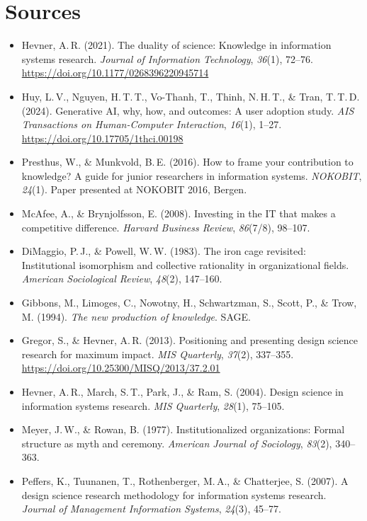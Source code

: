 \documentclass[11pt,a4paper,british,twoside=false,headings=small,chapterprefix=false,numbers=noenddot]{scrbook}
\begin{document}
\section*{Sources}
\begin{itemize}\small
  \item Hevner, A.\,R. (2021). The duality of science: Knowledge in information systems research. \emph{Journal of Information Technology}, \emph{36}(1), 72--76. \url{https://doi.org/10.1177/0268396220945714}
  \item Huy, L.\,V., Nguyen, H.\,T.\,T., Vo-Thanh, T., Thinh, N.\,H.\,T., \& Tran, T.\,T.\,D. (2024). Generative AI, why, how, and outcomes: A user adoption study. \emph{AIS Transactions on Human-Computer Interaction}, \emph{16}(1), 1--27. \url{https://doi.org/10.17705/1thci.00198}
  \item Presthus, W., \& Munkvold, B.\,E. (2016). How to frame your contribution to knowledge? A guide for junior researchers in information systems. \emph{NOKOBIT}, \emph{24}(1). Paper presented at NOKOBIT 2016, Bergen.
  \item McAfee, A., \& Brynjolfsson, E. (2008). Investing in the IT that makes a competitive difference. \emph{Harvard Business Review}, \emph{86}(7/8), 98--107.
  \item DiMaggio, P.\,J., \& Powell, W.\,W. (1983). The iron cage revisited: Institutional isomorphism and collective rationality in organizational fields. \emph{American Sociological Review}, \emph{48}(2), 147--160.
  \item Gibbons, M., Limoges, C., Nowotny, H., Schwartzman, S., Scott, P., \& Trow, M. (1994). \emph{The new production of knowledge}. SAGE.
  \item Gregor, S., \& Hevner, A.\,R. (2013). Positioning and presenting design science research for maximum impact. \emph{MIS Quarterly}, \emph{37}(2), 337--355. \url{https://doi.org/10.25300/MISQ/2013/37.2.01}
  \item Hevner, A.\,R., March, S.\,T., Park, J., \& Ram, S. (2004). Design science in information systems research. \emph{MIS Quarterly}, \emph{28}(1), 75--105.
  \item Meyer, J.\,W., \& Rowan, B. (1977). Institutionalized organizations: Formal structure as myth and ceremony. \emph{American Journal of Sociology}, \emph{83}(2), 340--363.
  \item Peffers, K., Tuunanen, T., Rothenberger, M.\,A., \& Chatterjee, S. (2007). A design science research methodology for information systems research. \emph{Journal of Management Information Systems}, \emph{24}(3), 45--77.

\end{itemize}
\end{document}
